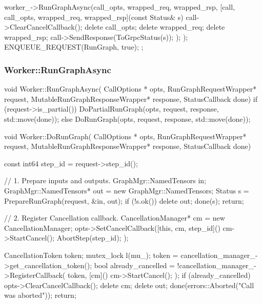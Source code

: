 \begin{content}
\begin{leftbar}
\begin{c++}
{{{      worker_->RunGraphAsync(call_opts, wrapped_req, wrapped_rsp, 
        [call, call_opts, wrapped_req, wrapped_rsp](const Status& s) {
            call->ClearCancelCallback();
            delete call_opts;
            delete wrapped_req;
            delete wrapped_rsp;
            call->SendResponse(ToGrpcStatus(s));
        });
    });
    ENQUEUE_REQUEST(RunGraph, true);
  }
};
\end{c++}
\end{leftbar}

\subsubsection{Worker::RunGraphAsync}

\begin{leftbar}
\begin{c++}
void Worker::RunGraphAsync(
    CallOptions * opts, 
    RunGraphRequestWrapper* request,
    MutableRunGraphResponseWrapper* response,
    StatusCallback done) {
  if (request->is_partial()) {
    DoPartialRunGraph(opts, request, response, std::move(done));
  } else {
    DoRunGraph(opts, request, response, std::move(done));
  }
}
\end{c++}
\end{leftbar}

\begin{leftbar}
\begin{c++}
void Worker::DoRunGraph(
    CallOptions * opts, 
    RunGraphRequestWrapper* request,
    MutableRunGraphResponseWrapper* response,
    StatusCallback done) {
  const int64 step_id = request->step_id();

  // 1. Prepare inputs and outputs.
  GraphMgr::NamedTensors in;
  GraphMgr::NamedTensors* out = new GraphMgr::NamedTensors;
  Status s = PrepareRunGraph(request, &in, out);
  if (!s.ok()) {
    delete out;
    done(s);
    return;
  }
  
  // 2. Register Cancellation callback.
  CancellationManager* cm = new CancellationManager;
  opts->SetCancelCallback([this, cm, step_id]() {
    cm->StartCancel();
    AbortStep(step_id);
  });

  CancellationToken token;
  {
    mutex_lock l(mu_);
    token = cancellation_manager_->get_cancellation_token();
    bool already_cancelled = !cancellation_manager_->RegisterCallback(
        token, [cm]() { cm->StartCancel(); });
    if (already_cancelled) {
      opts->ClearCancelCallback();
      delete cm;
      delete out;
      done(errors::Aborted("Call was aborted"));
      return;
    }
  }

}
\end{c++}
\end{leftbar}
\end{content}
